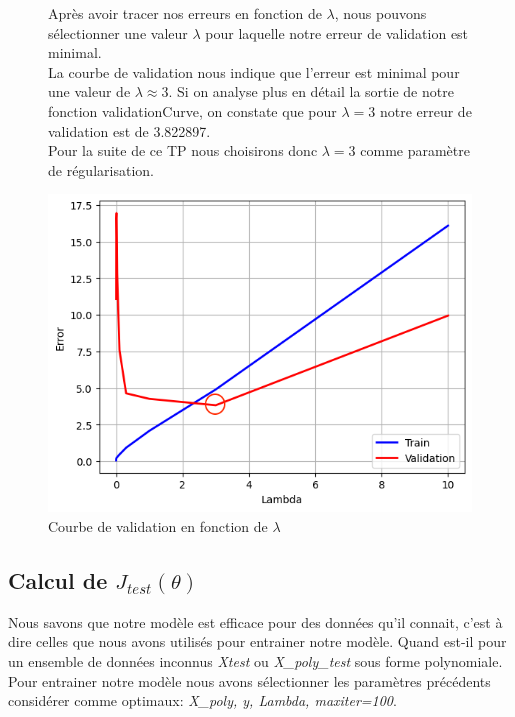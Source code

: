 \begin{figure}[!h]
    \begin{minipage}{.44\linewidth}
        Après avoir tracer nos erreurs en fonction de $\lambda$, nous pouvons sélectionner une valeur $\lambda$ pour laquelle notre erreur de validation est minimal. \\
        La courbe de validation nous indique que l'erreur est minimal pour une valeur de $\lambda \approx 3$. Si on analyse plus en détail la sortie de notre fonction validationCurve, on constate que pour $\lambda = 3$ notre erreur de validation est 
        de 3.822897. \\

        Pour la suite de ce TP nous choisirons donc $\lambda = 3$ comme paramètre de régularisation.
    \end{minipage}\hfill
    \begin{minipage}{.56\linewidth}
        \begin{center}
            \includegraphics[width=.9\textwidth]{./img/5.3.png}
            \caption{\label{fig:validation-curve-poly}Courbe de validation en fonction de $\lambda$}  
        \end{center}
    \end{minipage}
\end{figure}

\subsection{Calcul de $J_{test}(\theta)$}

Nous savons que notre modèle est efficace pour des données qu'il connait, c'est à dire celles que nous avons utilisés pour entrainer notre modèle. Quand est-il pour un ensemble de données inconnus \textit{Xtest} ou \textit{X\_poly\_test} sous forme polynomiale. 
Pour entrainer notre modèle nous avons sélectionner les paramètres précédents considérer comme optimaux: \textit{X\_poly, y, Lambda, maxiter=100}.

